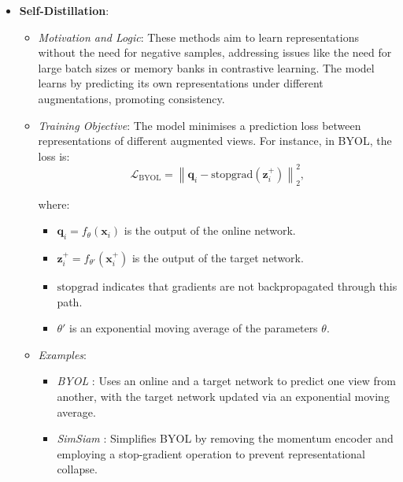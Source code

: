 \begin{itemize}
\begin{itemize}
\begin{itemize}
          \end{itemize}

    \end{itemize}
    \item \textbf{Self-Distillation}:
    \begin{itemize}
        \item \emph{Motivation and Logic}: These methods aim to learn representations without the need for negative samples, addressing issues like the need for large batch sizes or memory banks in contrastive learning. The model learns by predicting its own representations under different augmentations, promoting consistency.
        
        \item \emph{Training Objective}: The model minimises a prediction loss between representations of different augmented views. For instance, in BYOL, the loss is:
                \[
        \mathcal{L}_{\text{BYOL}} = \left\| \mathbf{q}_i - \text{stopgrad}(\mathbf{z}_i^+) \right\|_2^2,
        \]

        where:
        \begin{itemize}
            \item \( \mathbf{q}_i = f_{\theta}(\mathbf{x}_i) \) is the output of the online network.
            \item \( \mathbf{z}_i^+ = f_{\theta'}(\mathbf{x}_i^+) \) is the output of the target network.
            \item \( \text{stopgrad} \) indicates that gradients are not backpropagated through this path.
            \item \( \theta' \) is an exponential moving average of the parameters \( \theta \).
        \end{itemize}
        
        \item \emph{Examples}:
        \begin{itemize}
            \item \emph{BYOL} \citep{grill2020bootstrap}: Uses an online and a target network to predict one view from another, with the target network updated via an exponential moving average.
            \item \emph{SimSiam} \citep{chen2021exploring}: Simplifies BYOL by removing the momentum encoder and employing a stop-gradient operation to prevent representational collapse.
        \end{itemize}
    \end{itemize}


\end{itemize}
